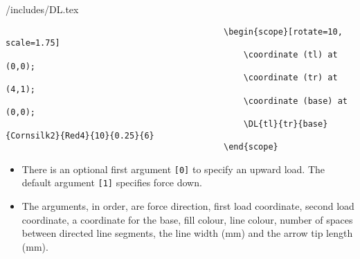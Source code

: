 \documentclass[9pt, xcolor={svgnames, x11names}]{beamer}
\begin{document}
\begin{frame}[fragile]{/includes/DL.tex}	

										\begin{verbatim}
											\begin{scope}[rotate=10, scale=1.75]
												\coordinate (tl) at (0,0);
												\coordinate (tr) at (4,1);
												\coordinate (base) at (0,0);		
												\DL{tl}{tr}{base}{Cornsilk2}{Red4}{10}{0.25}{6}
											\end{scope}
										\end{verbatim}

	\begin{itemize}
		\item There is an optional first argument \verb|[0]| to specify an upward load. The default argument \verb|[1]| specifies force down.
		\item The arguments, in order, are force direction, first load coordinate, second load coordinate, a coordinate for the base, fill colour, line colour, number of spaces between directed line segments, the line width (mm) and the arrow tip length (mm). 
	\end{itemize}	


\end{frame}


\end{document}
